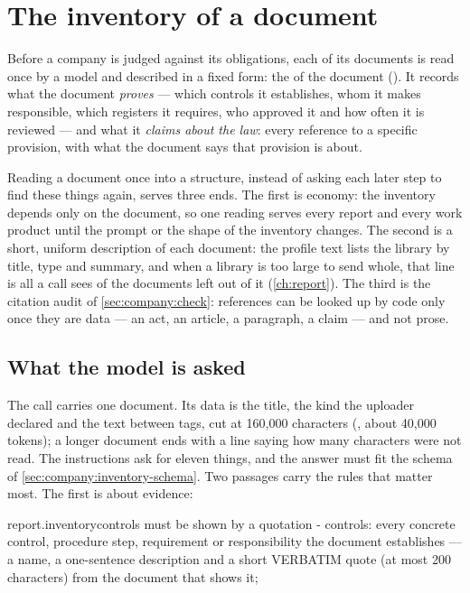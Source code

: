 \section{The inventory of a document}\label{sec:company:inventory}

Before a company is judged against its obligations, each of its documents is read once by a
model and described in a fixed form: the  of the document
(). It records what the document \emph{proves} --- which controls
it establishes, whom it makes responsible, which registers it requires, who approved it and
how often it is reviewed --- and what it \emph{claims about the law}: every reference to a
specific provision, with what the document says that provision is about.

Reading a document once into a structure, instead of asking each later step to find these
things again, serves three ends. The first is economy: the inventory depends only on the
document, so one reading serves every report and every work product until the prompt or the
shape of the inventory changes. The second is a short, uniform description of each document:
the profile text lists the library by title, type and summary, and when a library is too
large to send whole, that line is all a call sees of the documents left out of it
(\cref{ch:report}). The third is the citation audit of \cref{sec:company:check}: references
can be looked up by code only once they are data --- an act, an article, a paragraph, a claim
--- and not prose.

\subsection{What the model is asked}\label{sec:company:inventory-prompt}

The call carries one document. Its data is the title, the kind the uploader declared and the
text between  tags, cut at 160,000 characters (,
about 40,000 tokens); a longer document ends with a line saying how many characters were not
read. The instructions ask for eleven things, and the answer must fit the schema of
\cref{sec:company:inventory-schema}. Two passages carry the rules that matter most. The first
is about evidence:

\begin{promptexcerpt}{report.inventory}{controls must be shown by a quotation}
- controls: every concrete control, procedure step, requirement or responsibility
  the document establishes — a name, a one-sentence description and a short
  VERBATIM quote (at most 200 characters) from the document that shows it;
\end{promptexcerpt}

